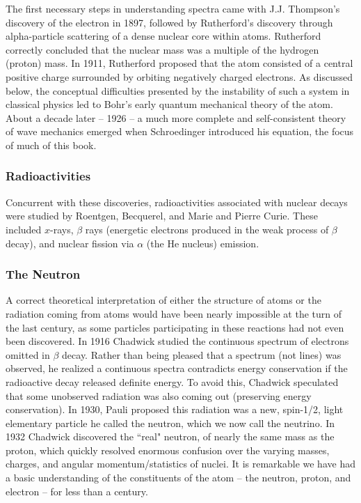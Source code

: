 The first necessary steps in understanding spectra came with J.J. Thompson's
discovery of the electron in 1897, followed by Rutherford's discovery through
alpha-particle scattering of a dense nuclear core within atoms. Rutherford
correctly concluded that the nuclear mass was a multiple of the hydrogen
(proton) mass. In 1911, Rutherford proposed that the atom consisted of
a central positive charge surrounded by orbiting negatively charged electrons.
As discussed below, the conceptual difficulties presented by the instability of
such a system in classical physics led to Bohr's early quantum mechanical
theory of the atom. About a decade later -- 1926 -- a much more complete and
self-consistent theory of wave mechanics emerged when Schroedinger introduced
his equation, the focus of much of this book. 

\subsubsection{Radioactivities} 

Concurrent with these discoveries, radioactivities associated with nuclear
decays were studied by Roentgen, Becquerel, and Marie and Pierre Curie. These
included  $x$-rays,  $\beta$ rays (energetic electrons produced in the weak
process of  $\beta$ decay), and nuclear fission via  $\alpha$ (the He nucleus)
emission.

\subsubsection{The Neutron} 

A correct theoretical interpretation of either the structure of atoms or the
radiation coming from atoms would have been nearly impossible at the turn of
the last century, as some particles participating in these reactions had not
even been discovered. In 1916 Chadwick studied the continuous spectrum of
electrons omitted in $\beta$ decay. Rather than being pleased that a spectrum
(not lines) was observed, he realized a continuous spectra contradicts energy
conservation if the radioactive decay released definite energy. To avoid this,
Chadwick speculated that some unobserved radiation was also coming out
(preserving energy conservation). In 1930, Pauli proposed this radiation was
a new, spin-1/2, light elementary particle he called the neutron, which we now
call the neutrino. In 1932 Chadwick discovered the ``real" neutron, of nearly
the same mass as the proton, which quickly resolved enormous confusion over the
varying masses, charges, and angular momentum/statistics of nuclei. It is
remarkable we have had a basic understanding of the constituents of the atom --
the neutron, proton, and electron -- for less than a century. 

